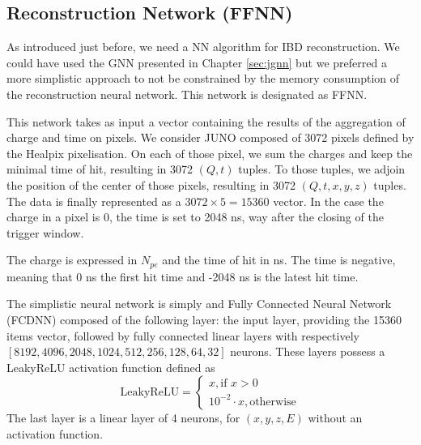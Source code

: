 \documentclass[../main.tex]{subfiles}
\begin{document}
\subsection{Reconstruction Network (FFNN)}
\label{sec:janne:arch:reco}

As introduced just before, we need a NN algorithm for IBD reconstruction. We could have used the GNN presented in Chapter \ref{sec:jgnn} but we preferred a more simplistic approach to not be constrained by the memory consumption of the reconstruction neural network. This network is designated as FFNN.

This network takes as input a vector containing the results of the aggregation of charge and time on pixels. We consider JUNO composed of 3072 pixels defined by the Healpix \cite{gorski_healpix_2005} pixelisation. On each of those pixel, we sum the charges and keep the minimal time of hit, resulting in 3072 $(Q, t)$ tuples. To those tuples, we adjoin the position of the center of those pixels, resulting in 3072 $(Q, t, x, y, z)$ tuples. The data is finally represented as a $3072 \times 5 = 15360$ vector. In the case the charge in a pixel is 0, the time is set to 2048 ns, way after the closing of the trigger window.

The charge is expressed in $N_{pe}$ and the time of hit in ns. The time is negative, meaning that 0 ns the first hit time and -2048 ns is the latest hit time.

The simplistic neural network is simply and Fully Connected Neural Network (FCDNN) composed of the following layer: the input layer, providing the 15360 items vector, followed by fully connected linear layers with respectively $[8192, 4096, 2048, 1024, 512, 256, 128, 64, 32]$ neurons. These layers possess a LeakyReLU activation function defined as
\begin{equation}
  \mathrm{LeakyReLU} = \begin{cases}
    x, \text{if } x > 0 \\
    10^{-2} \cdot x, \text{otherwise}
  \end{cases}
\end{equation}
The last layer is a linear layer of 4 neurons, for $(x, y, z, E)$ without an activation function.
\end{document}
